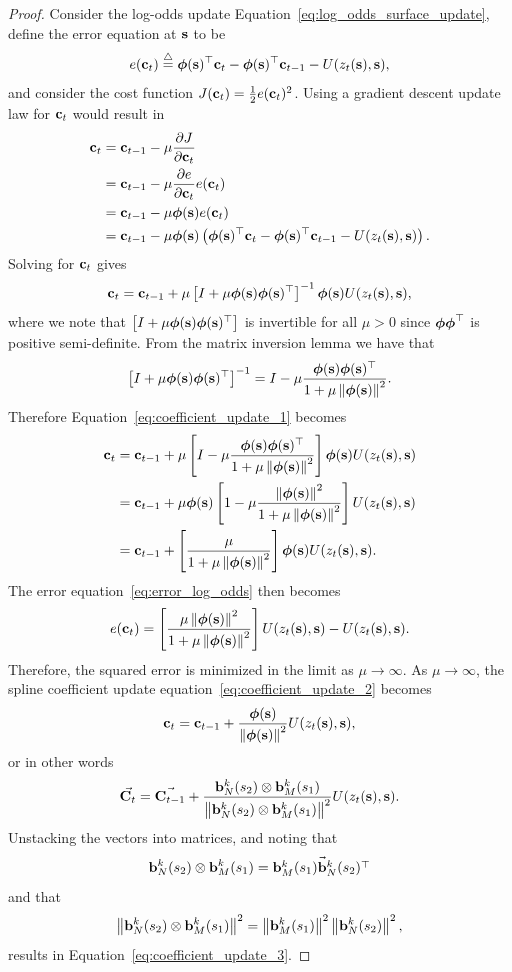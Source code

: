 \begin{proof}
Consider the log-odds update Equation~\eqref{eq:log_odds_surface_update}, define the error equation at $\mathbf{s}$ to be
\begin{equation}\label{eq:error_log_odds}
e(\cbf_t) \defeq \phibf(\sbf)^\top \cbf_t - \phibf(\sbf)^\top \cbf_{t-1} - U(z_t(\sbf), \sbf),
\end{equation}
and consider the cost function $J(\mathbf{c}_t)=\frac{1}{2}e(\mathbf{c}_t)^2$.  Using a gradient descent update law for $\mathbf{c}_t$ would result in
\begin{align*}
\mathbf{c}_t &= \mathbf{c}_{t-1} - \mu \frac{\partial J}{\partial\mathbf{c}_t} \\
       &= \mathbf{c}_{t-1} - \mu \frac{\partial e}{\partial\mathbf{c}_t} e(\mathbf{c}_t) \\
	   &= \mathbf{c}_{t-1} - \mu \boldsymbol{\phi}(\mathbf{s}) e(\mathbf{c}_t) \\
	   &= \mathbf{c}_{t-1} - \mu \boldsymbol{\phi}(\mathbf{s}) \left(\boldsymbol{\phi}(\mathbf{s})^\top \mathbf{c}_t - \boldsymbol{\phi}(\mathbf{s})^\top \mathbf{c}_{t-1} - U(z_t(\mathbf{s}), \mathbf{s})\right).
\end{align*}
Solving for $\mathbf{c}_t$ gives 
\begin{equation}\label{eq:coefficient_update_1}
\cbf_t = \cbf_{t-1} + \mu \left[I + \mu \phibf(\sbf)\phibf(\sbf)^\top\right]^{-1}\phibf(\sbf) U(z_t(\sbf), \sbf),
\end{equation}
where we note that $\left[I + \mu \boldsymbol{\phi}(\mathbf{s})\boldsymbol{\phi}(\mathbf{s})^\top\right]$ is invertible for all $\mu>0$ since $\boldsymbol{\phi}\boldsymbol{\phi}^\top$ is positive semi-definite.  From the matrix inversion lemma we have that
\[
\left[I + \mu \boldsymbol{\phi}(\mathbf{s})\boldsymbol{\phi}(\mathbf{s})^\top\right]^{-1} = I - \mu\frac{\boldsymbol{\phi}(\mathbf{s})\boldsymbol{\phi}(\mathbf{s})^\top}{1+\mu\left\|\boldsymbol{\phi}(\mathbf{s})\right\|^2}.
\]
Therefore Equation~\eqref{eq:coefficient_update_1} becomes
\begin{align}
	\cbf_t &= \cbf_{t-1} + \mu \left[I - \mu\frac{\phibf(\sbf)\phibf(\sbf)^\top}{1+\mu\norm{\phibf(\sbf)}^2}\right]\phibf(\sbf)		   U(z_t(\sbf), \sbf) \notag \\
	       &= \cbf_{t-1} + \mu \phibf(\sbf)\left[1 - \mu\frac{\norm{\phibf(\sbf)}^2}{1+\mu\norm{\phibf(\sbf)}^2}\right]U(z_t(\sbf), \sbf) \notag \\
	       &= \cbf_{t-1} + \left[\frac{\mu}{1+\mu\norm{\phibf(\sbf)}^2}\right]\phibf(\sbf) U(z_t(\sbf), \sbf).
	       \label{eq:coefficient_update_2}
\end{align}
The error equation~\eqref{eq:error_log_odds} then becomes
\[
e(\mathbf{c}_t) = \left[\frac{\mu\left\|\boldsymbol{\phi}(\mathbf{s})\right\|^2}{1+\mu\left\|\boldsymbol{\phi}(\mathbf{s})\right\|^2}\right] U(z_t(\mathbf{s}), \mathbf{s}) - U(z_t(\mathbf{s}), \mathbf{s}).
\]
Therefore, the squared error is minimized in the limit as $\mu\to\infty$.  As $\mu\to\infty$, the spline coefficient update equation~\eqref{eq:coefficient_update_2} becomes
\[
\mathbf{c}_t = \mathbf{c}_{t-1} + \frac{\boldsymbol{\phi}(\mathbf{s})}{\left\|\boldsymbol{\phi}(\mathbf{s})\right\|^2} U(z_t(\mathbf{s}), \mathbf{s}),
\]
or in other words
\[
\vec{\mathbf{C}_t} = \vec{\mathbf{C}_{t-1}} + \frac{\mathbf{b}_N^k(s_2) \otimes \mathbf{b}_M^k(s_1)}{\left\|\mathbf{b}_N^k(s_2) \otimes \mathbf{b}_M^k(s_1)\right\|^2} U(z_t(\mathbf{s}), \mathbf{s}).
\]
Unstacking the vectors into matrices, and noting that 
\[
\mathbf{b}_N^k(s_2) \otimes \mathbf{b}_M^k(s_1)=\vec{\mathbf{b}_M^k(s_1)\mathbf{b}_N^k(s_2)^\top}
\]
and that 
\[
\left\|\mathbf{b}_N^k(s_2) \otimes \mathbf{b}_M^k(s_1)\right\|^2=\left\|\mathbf{b}_M^k(s_1)\right\|^2 \left\|\mathbf{b}_N^k(s_2)\right\|^2,
\] 
results in Equation~\eqref{eq:coefficient_update_3}.
\end{proof}

